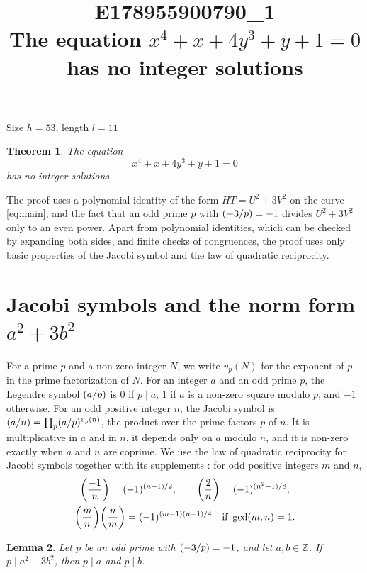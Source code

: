 \documentclass[11pt]{article}
\title{\textbf{E178955900790\_1}\\[4pt] {\Large The equation $x^{4}+x+4y^{3}+y+1=0$ has no integer solutions}}
\author{}
\date{}
\newtheorem{theorem}{Theorem}
\newtheorem{lemma}[theorem]{Lemma}
\newcommand{\Z}{\mathbb{Z}}
\newcommand{\leg}[2]{\mathchoice{\biggl(\dfrac{#1}{#2}\biggr)}{(#1/#2)}{(#1/#2)}{(#1/#2)}}
\begin{document}
\maketitle
\vspace{-8ex}
\begin{center}
Size $h=53$, length $l=11$
\end{center}

\begin{theorem}\label{thm:main}
The equation
\begin{equation}\label{eq:main}
x^{4}+x+4y^{3}+y+1=0
\end{equation}
has no integer solutions.
\end{theorem}

The proof uses a polynomial identity of the form $HT=U^2+3V^2$ on the curve \eqref{eq:main}, and the fact that an odd prime $p$ with $\leg{-3}{p}=-1$ divides $U^2+3V^2$ only to an even power. Apart from polynomial identities, which can be checked by expanding both sides, and finite checks of congruences, the proof uses only basic properties of the Jacobi symbol and the law of quadratic reciprocity.

\section{\texorpdfstring{Jacobi symbols and the norm form $a^2+3b^2$}{Jacobi symbols and the norm form}}

For a prime $p$ and a non-zero integer $N$, we write $v_p(N)$ for the exponent of $p$ in the prime factorization of $N$. For an integer $a$ and an odd prime $p$, the Legendre symbol $\leg{a}{p}$ is $0$ if $p\mid a$, $1$ if $a$ is a non-zero square modulo $p$, and $-1$ otherwise. For an odd positive integer $n$, the Jacobi symbol is $\leg{a}{n}=\prod_p\leg{a}{p}^{v_p(n)}$, the product over the prime factors $p$ of $n$. It is multiplicative in $a$ and in $n$, it depends only on $a$ modulo $n$, and it is non-zero exactly when $a$ and $n$ are coprime. We use the law of quadratic reciprocity for Jacobi symbols together with its supplements \cite[Chapter~5, \S2]{IR}: for odd positive integers $m$ and $n$,
\begin{gather*}
\leg{-1}{n}=(-1)^{(n-1)/2},\qquad\leg{2}{n}=(-1)^{(n^2-1)/8},\\
\leg{m}{n}\leg{n}{m}=(-1)^{(m-1)(n-1)/4}\quad\text{if }\gcd(m,n)=1.
\end{gather*}

\begin{lemma}\label{lem:divides}
Let $p$ be an odd prime with $\leg{-3}{p}=-1$, and let $a,b\in\Z$. If $p\mid a^2+3b^2$, then $p\mid a$ and $p\mid b$.
\end{lemma}
\end{document}
